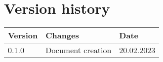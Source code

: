 \chapter*{Version history}
\thispagestyle{empty}
\label{chap:versions}

\begin{tabular}{|m{}|m{}|m{}|} 
 \hline
 \textbf{Version} & \textbf{Changes} & \textbf{Date} \\ [0.5ex] 
 \hline
 0.1.0 & Document creation & 20.02.2023  \\ 
 \hline
\end{tabular}
